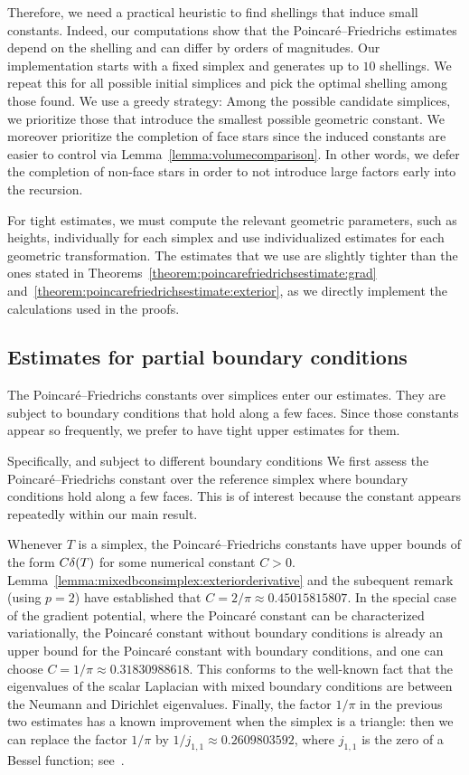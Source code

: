 \documentclass[10pt,a4paper]{article}
\begin{document}
Therefore, we need a practical heuristic to find shellings that induce small constants. Indeed, our computations show that the Poincar\'e--Friedrichs estimates depend on the shelling and can differ by orders of magnitudes. Our implementation starts with a fixed simplex and generates up to $10$ shellings. 
We repeat this for all possible initial simplices and pick the optimal shelling among those found.
We use a greedy strategy: Among the possible candidate simplices, we prioritize those that introduce the smallest possible geometric constant. 
We moreover prioritize the completion of face stars since the induced constants are easier to control via Lemma~\ref{lemma:volumecomparison}. 
In other words, we defer the completion of non-face stars in order to not introduce large factors early into the recursion. 

For tight estimates, we must compute the relevant geometric parameters, such as heights, individually for each simplex and use individualized estimates for each geometric transformation. The estimates that we use are slightly tighter than the ones stated in Theorems~\ref{theorem:poincarefriedrichsestimate:grad} and~\ref{theorem:poincarefriedrichsestimate:exterior},
as we directly implement the calculations used in the proofs.







\subsection{Estimates for partial boundary conditions}

The Poincar\'e--Friedrichs constants over simplices enter our estimates.
They are subject to boundary conditions that hold along a few faces. 
Since those constants appear so frequently, we prefer to have tight upper estimates for them. 

Specifically, and subject to different boundary conditions 
We first assess the Poincar\'e--Friedrichs constant over the reference simplex where boundary conditions hold along a few faces. 
This is of interest because the constant appears repeatedly within our main result. 

Whenever $T$ is a simplex, the Poincar\'e--Friedrichs constants have upper bounds of the form $C {\delta}(T)$ for some numerical constant $C > 0$.
Lemma~\ref{lemma:mixedbconsimplex:exteriorderivative} and the subequent remark (using $p=2$) have established that $C = 2/\pi \approx 0.45015815807$. In the special case of the gradient potential, where the Poincar\'e constant can be characterized variationally, the Poincar\'e constant without boundary conditions is already an upper bound for the Poincar\'e constant with boundary conditions, and one can choose $C = 1/\pi \approx 0.31830988618$.
This conforms to the well-known fact that the eigenvalues of the scalar Laplacian with mixed boundary conditions are between the Neumann and Dirichlet eigenvalues.
Finally, the factor $1/\pi$ in the previous two estimates has a known improvement when the simplex is a triangle:
then we can replace the factor $1/\pi$ by $1/j_{1,1} \approx 0.2609803592$, where $j_{1,1}$ is the zero of a Bessel function; see~\cite{laugesen2010minimizing}.
\end{document}
